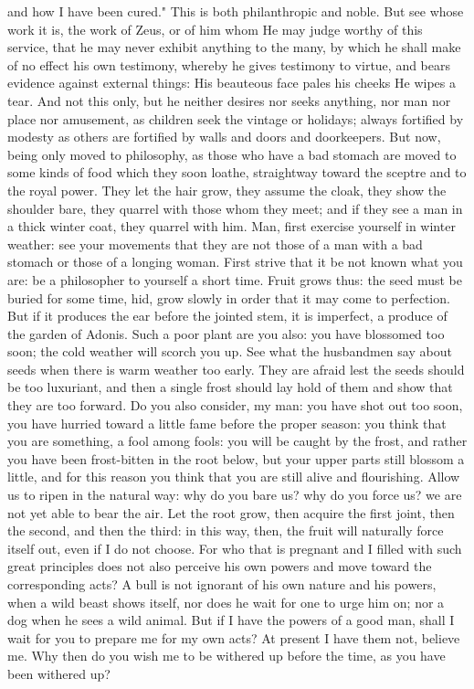 \documentclass[a4paper]{article}
\begin{document}
and how I have been cured." This is both philanthropic and noble. But see whose
work it is, the work of Zeus, or of him whom He may judge worthy of this
service, that he may never exhibit anything to the many, by which he shall make
of no effect his own testimony, whereby he gives testimony to virtue, and bears
evidence against external things:
       His beauteous face pales his cheeks
       He wipes a tear.
    And not this only, but he neither desires nor seeks anything, nor man nor
place nor amusement, as children seek the vintage or holidays; always fortified
by modesty as others are fortified by walls and doors and doorkeepers.
    But now, being only moved to philosophy, as those who have a bad stomach
are moved to some kinds of food which they soon loathe, straightway toward the
sceptre and to the royal power. They let the hair grow, they assume the cloak,
they show the shoulder bare, they quarrel with those whom they meet; and if
they see a man in a thick winter coat, they quarrel with him. Man, first
exercise yourself in winter weather: see your movements that they are not those
of a man with a bad stomach or those of a longing woman. First strive that it
be not known what you are: be a philosopher to yourself a short time. Fruit
grows thus: the seed must be buried for some time, hid, grow slowly in order
that it may come to perfection. But if it produces the ear before the jointed
stem, it is imperfect, a produce of the garden of Adonis. Such a poor plant are
you also: you have blossomed too soon; the cold weather will scorch you up. See
what the husbandmen say about seeds when there is warm weather too early. They
are afraid lest the seeds should be too luxuriant, and then a single frost
should lay hold of them and show that they are too forward. Do you also
consider, my man: you have shot out too soon, you have hurried toward a little
fame before the proper season: you think that you are something, a fool among
fools: you will be caught by the frost, and rather you have been frost-bitten
in the root below, but your upper parts still blossom a little, and for this
reason you think that you are still alive and flourishing. Allow us to ripen in
the natural way: why do you bare us? why do you force us? we are not yet able
to bear the air. Let the root grow, then acquire the first joint, then the
second, and then the third: in this way, then, the fruit will naturally force
itself out, even if I do not choose. For who that is pregnant and I filled with
such great principles does not also perceive his own powers and move toward the
corresponding acts? A bull is not ignorant of his own nature and his powers,
when a wild beast shows itself, nor does he wait for one to urge him on; nor a
dog when he sees a wild animal. But if I have the powers of a good man, shall I
wait for you to prepare me for my own acts? At present I have them not, believe
me. Why then do you wish me to be withered up before the time, as you have been
withered up?
\end{document}

